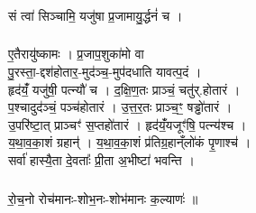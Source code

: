 \subsubsection{}
सं त्वा॑ सिञ्चामि॒ यजु॑षा प्र॒जामायु॒र्द्धनं॑ च ।\\
\subsubsection{}
ए॒तैरायु॑ष्कामः । प्र॒जाप॒शुका॑मो वा\\
पु॒रस्ता॒-द्दश॑होतार॒-मुद॑ञ्च॒-मुप॑दधाति यावत्प॒दं ।\\
हृद॑यंँ॒ यजु॑षी॒ पत्न्यौ॑ च । द॒क्षि॒ण॒तः प्राञ्चं॒ चतु॑र्.होतारं ।\\
प॒श्चादुद॑ञ्चं॒ पञ्च॑होतारं । उ॒त्त॒र॒तः प्राञ्च॒ꣳ॒ षड्ढो॑तारं ।\\
उ॒परि॑ष्टा॒त् प्राञ्चꣳ॑ स॒प्तहो॑तारं । हृद॑यंँ॒यजूꣳ॑षि॒ पत्न्य॑श्च ।\\
य॒था॒व॒का॒शं ग्रहान्॑ । य॒था॒व॒का॒शं प्र॑तिग्र॒हान्ँलो॑कं पृ॒णाश्च॑ ।\\
सर्वा॑ हास्यै॒ता दे॒वताः᳚ प्री॒ता अ॒भीष्टा॑ भवन्ति । \\
\subsubsection{}
रो॒च॒नो रोच॑मानः-शोभ॒नः-शोभ॑मानः क॒ल्याणः॑ ॥\\




